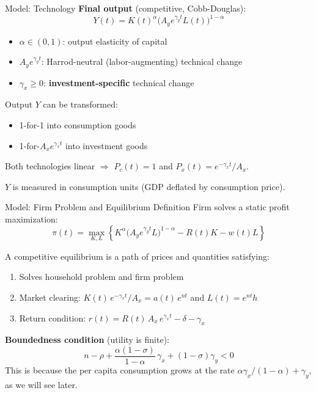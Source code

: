 \documentclass[blue]{beamer}
\begin{document}
	\begin{frame}{Model: Technology}
		\textbf{Final output} (competitive, Cobb-Douglas):
		\[
		Y(t) = K(t)^\alpha \bigl(A_y e^{\gamma_y t} L(t)\bigr)^{1-\alpha} 
		\]
		
		\begin{itemize}
			\item $\alpha \in (0,1)$: output elasticity of capital
			\item $A_y e^{\gamma_y t}$: Harrod-neutral (labor-augmenting) technical change
			\item $\gamma_x \geq 0$: \textbf{investment-specific} technical change
		\end{itemize}
		
		Output $Y$ can be transformed:
		\begin{itemize}
			\item 1-for-1 into consumption goods
			\item 1-for-$A_x e^{\gamma_x t}$ into investment goods
		\end{itemize}
		
		Both technologies linear $\Rightarrow$ $P_c(t) = 1$ and $P_x(t) = e^{-\gamma_x t}/A_x$.
		
		$Y$ is measured in consumption units (GDP deflated by consumption price).
	\end{frame}

\begin{frame}{Model: Firm Problem and Equilibrium Definition}
	Firm solves a static profit maximization:
	\[
	\pi(t) = \max_{K,L}\left\{ K^\alpha \bigl(A_y e^{\gamma_y t} L\bigr)^{1-\alpha} - R(t)K - w(t)L \right\} 
	\]
	
	A competitive equilibrium is a path of prices and quantities satisfying:
	\begin{enumerate}
		\item Solves household problem and firm problem 
		\item Market clearing: $K(t)\, e^{-\gamma_x t}/A_x = a(t)\, e^{nt}$ and $L(t) = e^{nt} h$
		\item Return condition: $r(t) = R(t)\, A_x\, e^{\gamma_x t} - \delta - \gamma_x$
	\end{enumerate}
	
	\textbf{Boundedness condition} (utility is finite):
	\[
	n - \rho + \frac{\alpha(1-\sigma)}{1-\alpha}\,\gamma_x + (1-\sigma)\gamma_y < 0 
	\]
	This is because the per capita consumption grows at the rate $\alpha\gamma_x/(1-\alpha)+\gamma_y$, as we will see later.
\end{frame}
\end{document}
